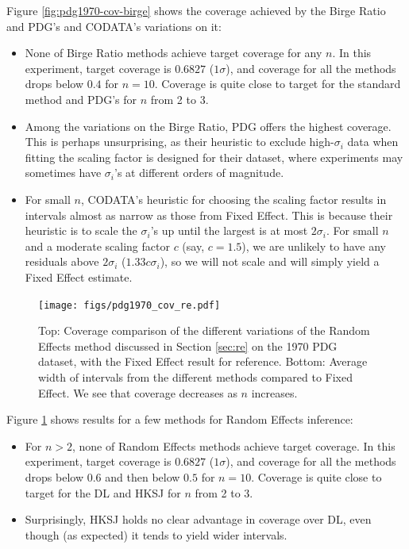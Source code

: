 \documentclass[letterpaper,12pt]{article}
\begin{document}
Figure \ref{fig:pdg1970-cov-birge} shows the coverage achieved by the Birge Ratio and PDG's and CODATA's variations on it:
\begin{itemize}
  \item None of Birge Ratio methods achieve target coverage for any $n$. In this experiment, target coverage is $0.6827$ ($1\sigma$), and coverage for all the methods drops below $0.4$ for $n=10$. Coverage is quite close to target for the standard method and PDG's for $n$ from 2 to 3.
  \item Among the variations on the Birge Ratio, PDG offers the highest coverage. This is perhaps unsurprising, as their heuristic to exclude high-$\sigma_i$ data when fitting the scaling factor is designed for their dataset, where experiments may sometimes have $\sigma_i$'s at different orders of magnitude.
  \item For small $n$, CODATA's heuristic for choosing the scaling factor results in intervals almost as narrow as those from Fixed Effect. This is because their heuristic is to scale the $\sigma_i$'s up until the largest is at most $2\sigma_i$. For small $n$ and a moderate scaling factor $c$ (say, $c=1.5$), we are unlikely to have any residuals above $2\sigma_i$ ($1.33c\sigma_i$), so we will not scale and will simply yield a Fixed Effect estimate.
\end{itemize}

\begin{figure}[htbp]
  \texttt{[image: figs/pdg1970\_cov\_re.pdf]}
\caption{
Top: Coverage comparison of the different variations of the Random Effects method discussed in Section \ref{sec:re} on the 1970 PDG dataset, with the Fixed Effect result for reference. Bottom: Average width of intervals from the different methods compared to Fixed Effect. We see that coverage decreases as $n$ increases.
}\label{fig:pdg1970-cov-re}
\end{figure}

Figure \ref{fig:pdg1970-cov-re} shows results for a few methods for Random Effects inference:
\begin{itemize}
  \item For $n>2$, none of Random Effects methods achieve target coverage. In this experiment, target coverage is $0.6827$ ($1\sigma$), and coverage for all the methods drops below $0.6$ and then below $0.5$ for $n=10$. Coverage is quite close to target for the DL and HKSJ for $n$ from 2 to 3.
  \item Surprisingly, HKSJ holds no clear advantage in coverage over DL, even though (as expected) it tends to yield wider intervals.
\end{itemize}
\end{document}
